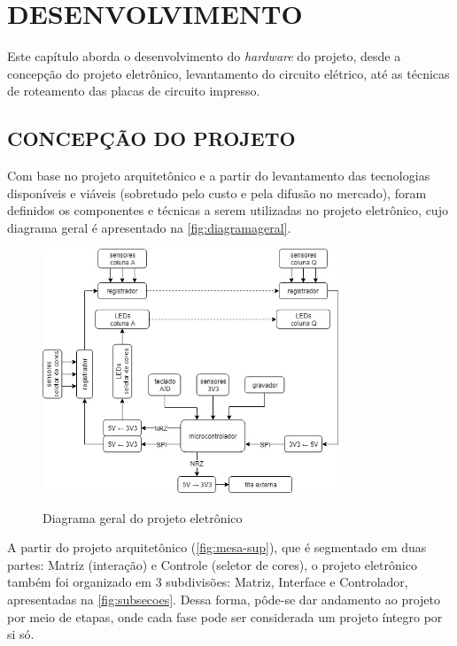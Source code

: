 
\chapter{DESENVOLVIMENTO}
\label{chap:metodologia}

Este capítulo aborda o desenvolvimento do \emph{hardware} do projeto, desde a concepção do projeto eletrônico, levantamento do circuito elétrico, até as técnicas de roteamento das placas de circuito impresso.

\section{CONCEPÇÃO DO PROJETO}
\label{sec:concepcao}

Com base no projeto arquitetônico e a partir do levantamento das tecnologias disponíveis e viáveis (sobretudo pelo custo e pela difusão no mercado), foram definidos os componentes e técnicas a serem utilizadas no projeto eletrônico, cujo diagrama geral é apresentado na \autoref{fig:diagramageral}.

\begin{figure}[H]
    \centering
    \caption{Diagrama geral do projeto eletrônico}
    \includegraphics[width=0.8\textwidth]{./dados/figuras/diagrama}
    \label{fig:diagramageral}
\end{figure}

A partir do projeto arquitetônico (\autoref{fig:mesa-sup}), que é segmentado em duas partes: Matriz (interação) e Controle (seletor de cores), o projeto eletrônico também foi organizado em 3 subdivisões: Matriz, Interface e Controlador, apresentadas na \autoref{fig:subsecoes}. Dessa forma, pôde-se dar andamento ao projeto por meio de etapas, onde cada fase pode ser considerada um projeto íntegro por si só.

